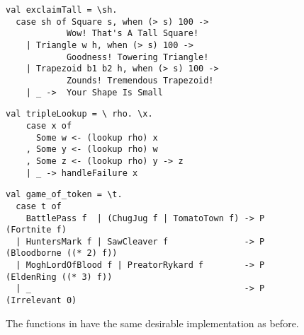\documentclass[manuscript,screen,review, 12pt, nonacm]{acmart}
\begin{document}
    \begin{figure}[ht] 
      \begin{minipage}[h]{0.54\linewidth}
        \pplst 
        \begin{lstlisting}[numbers=none, basicstyle=\tiny, xleftmargin=.2em,
          showstringspaces=false,
          frame=single]
val exclaimTall = \sh.
  case sh of Square s, when (> s) 100 -> 
            Wow! That's A Tall Square!  
    | Triangle w h, when (> s) 100 ->
            Goodness! Towering Triangle!
    | Trapezoid b1 b2 h, when (> s) 100 -> 
            Zounds! Tremendous Trapezoid!
    | _ ->  Your Shape Is Small
  \end{lstlisting}
          \label{fig:ppexclaimtall} 
      \end{minipage}%
      \begin{minipage}[h]{0.5\linewidth}
        \pplst 
        \begin{lstlisting}[numbers=none, basicstyle=\tiny, xleftmargin=2em,
                      frame=single]
  val tripleLookup = \ rho. \x.
    case x of 
      Some w <- (lookup rho) x
    , Some y <- (lookup rho) w
    , Some z <- (lookup rho) y -> z
    | _ -> handleFailure x

   \end{lstlisting}
            \label{fig:pptriplelookup} 
        \vspace{4ex}
      \end{minipage} 
      \begin{minipage}[h]{\linewidth}
        \pplst 
        \begin{lstlisting}[numbers=none, basicstyle=\tiny, xleftmargin=9em,
          showstringspaces=false,
          frame=single]
val game_of_token = \t. 
  case t of  
    BattlePass f  | (ChugJug f | TomatoTown f) -> P (Fortnite f)
  | HuntersMark f | SawCleaver f               -> P (Bloodborne ((* 2) f))
  | MoghLordOfBlood f | PreatorRykard f        -> P (EldenRing ((* 3) f))
  | _                                          -> P (Irrelevant 0)
\end{lstlisting}
          \label{fig:ppgot}
      \vspace{4ex}
      \end{minipage}%
      \caption{The functions in \PPlus have the same desirable implementation
      as before.}
  \label{fig:ppfuncs}
    \end{figure}        
    
\end{document}
